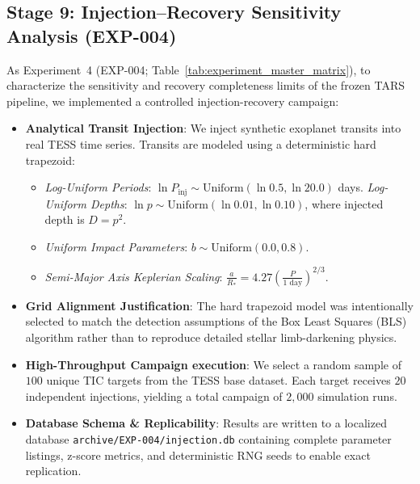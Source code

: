 \subsection{Stage 9: Injection--Recovery Sensitivity Analysis (EXP-004)} \label{sec:method_exp4_sensitivity}
As Experiment~4 (EXP-004; Table~\ref{tab:experiment_master_matrix}), to characterize the sensitivity and recovery completeness limits of the frozen TARS pipeline, we implemented a controlled injection-recovery campaign:
\begin{itemize}
    \item \textbf{Analytical Transit Injection}: We inject synthetic exoplanet transits into real TESS time series. Transits are modeled using a deterministic hard trapezoid:
        \begin{itemize}
            \item \textit{Log-Uniform Periods}: $\ln P_{\text{inj}} \sim \text{Uniform}(\ln 0.5, \ln 20.0)$ days.
            \textit{Log-Uniform Depths}: $\ln p \sim \text{Uniform}(\ln 0.01, \ln 0.10)$, where injected depth is $D = p^2$.
            \item \textit{Uniform Impact Parameters}: $b \sim \text{Uniform}(0.0, 0.8)$.
            \item \textit{Semi-Major Axis Keplerian Scaling}: $\frac{a}{R_*} = 4.27 \left(\frac{P}{1\text{ day}}\right)^{2/3}$.
        \end{itemize}
    \item \textbf{Grid Alignment Justification}: The hard trapezoid model was intentionally selected to match the detection assumptions of the Box Least Squares (BLS) algorithm rather than to reproduce detailed stellar limb-darkening physics.
    \item \textbf{High-Throughput Campaign execution}: We select a random sample of $100$ unique TIC targets from the TESS base dataset. Each target receives $20$ independent injections, yielding a total campaign of $2,000$ simulation runs.
    \item \textbf{Database Schema \& Replicability}: Results are written to a localized database \texttt{archive/EXP-004/injection.db} containing complete parameter listings, z-score metrics, and deterministic RNG seeds to enable exact replication.
\end{itemize}

